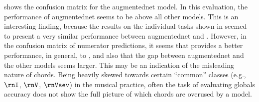 

 shows the
confusion matrix for the \gls{augmentednet} model. In this
evaluation, the performance of \gls{augmentednet} seems to
be above all other models. This is an interesting finding,
because the results on the individual tasks shown in
 seemed to present a very similar
performance between \gls{augmentednet} and
\textcite{micchi2021deep}. However, in the confusion matrix
of numerator predictions, it seems that
\textcite{mcleod2021modular} provides a better performance,
in general, to \textcite{micchi2021deep}, and also that the
gap between \gls{augmentednet} and the other models seems
larger. This may be an indication of the misleading nature
of chords. Being heavily skewed towards certain ``common''
classes (e.g., $\rnI$, $\rnV$, $\rnVsev$) in the musical
practice, often the task of evaluating globals accuracy does
not show the full picture of which chords are overused by a
model. 

